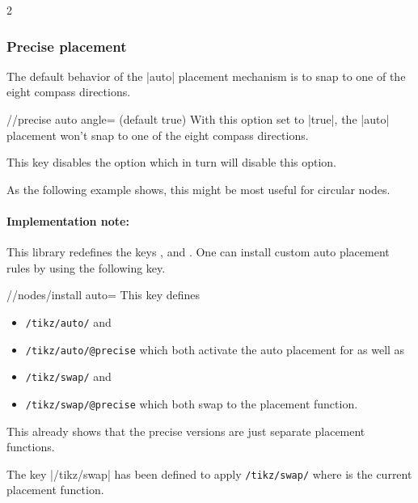 \begin{multicols*}{2}
\subsubsection{Precise placement}
The default behavior of the |auto| placement mechanism is
to snap to one of the eight compass directions.
\begin{key}{/\tikzext/precise auto angle= (default true)}
With this option set to |true|, the |auto| placement won't snap
to one of the eight compass directions.

This key disables the  option
which in turn will disable this option.

As the following example shows, this might be most useful for circular nodes.
\begin{codeexample}[preamble=\usetikzlibrary{ext.nodes}]
\end{codeexample}
\end{key}

\newcolumn
\paragraph{Implementation note:}
This library redefines the keys ,
 and .
One can install custom auto placement rules by using the following key.
\begin{key}{/\tikzext/nodes/install auto=}
  This key defines
  \begin{itemize}
  \item \texttt{/tikz/auto/} and
  \item \texttt{/tikz/auto/@precise}
        which both activate the auto placement for 
        as well as
  \item \texttt{/tikz/swap/} and
  \item \texttt{/tikz/swap/@precise}
        which both swap to the  placement function.
  \end{itemize}
  
  This already shows that the precise versions are just separate placement functions.
  
  The key |/tikz/swap| has been defined to apply \texttt{/tikz/swap/}
  where  is the current placement function.
\end{key}
\end{multicols*}
